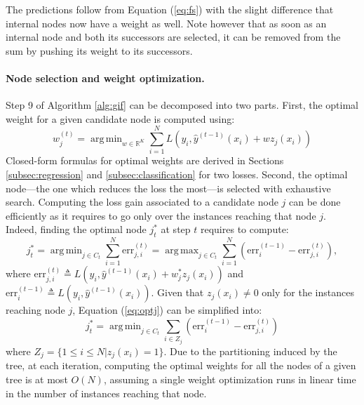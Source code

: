 \documentclass{article}
\DeclareMathOperator*{\argmin}{arg\,min}
\DeclareMathOperator*{\argmax}{arg\,max}
\begin{document}
The predictions follow from Equation (\ref{eq:fs}) with the slight difference
that internal nodes now have a weight as well. Note however that as soon as an
internal node and both its successors are selected, it can be removed from the
sum by pushing its weight to its successors.

\paragraph{Node selection and weight optimization.}
Step 9 of Algorithm \ref{alg:gif} can be decomposed into two parts. First,
the optimal weight for a given candidate node is computed using:
\begin{equation}\label{eq:nodeSel}
  w^{(t)}_j = \argmin_{w\in \mathbb{R}^K} \sum_{i=1}^N L\left(y_i, 
  \hat{y}^{(t-1)}(x_i) + w z_j(x_i)  \right)
\end{equation}
Closed-form formulas for optimal weights are derived in Sections
\ref{subsec:regression} and \ref{subsec:classification} for two losses. Second,
the optimal node---the one which reduces the loss the most---is selected with
exhaustive search. Computing the loss gain associated to a candidate node $j$
can be done efficiently as it requires to go only over the instances reaching
that node $j$. Indeed, finding the optimal node $j_t^*$ at step $t$ requires to 
compute:
\begin{equation}\label{eq:optj}
  j_t^* = \argmin_{j \in C_t} \sum_{i=1}^N \text{err}_{j,i}^{(t)} = \argmax_{j 
  \in C_t} 
  \sum_{i=1}^N (\text{err}^{(t-1)}_i - \text{err}_{j,i}^{(t)}),
\end{equation}
where $\text{err}_{j,i}^{(t)}\triangleq L(y_i,\hat{y}^{(t-1)}(x_i) + w_j^* z_j(x_i))$ and $\text{err}^{(t-1)}_i\triangleq L(y_i,\hat{y}^{(t-1)}(x_i))$.
Given that $z_j(x_i)\neq 0$ only for the instances reaching node $j$, Equation 
(\ref{eq:optj}) can be simplified into:
\begin{equation}\label{eq:optj2}
  j_t^* = \argmin_{j \in C_t} \sum_{i\in Z_j} (\text{err}^{(t-1)}_i - 
  \text{err}_{j,i}^{(t)})
\end{equation}
where $Z_j = \{1 \leq i \leq N | z_j (x_i)=1 \}$. Due to the partitioning
induced by the tree, at each iteration, computing the optimal
weights for all the nodes of a given tree is at most $O(N)$, assuming a single
weight optimization runs in linear time in the number of instances reaching
that node.
\end{document}
